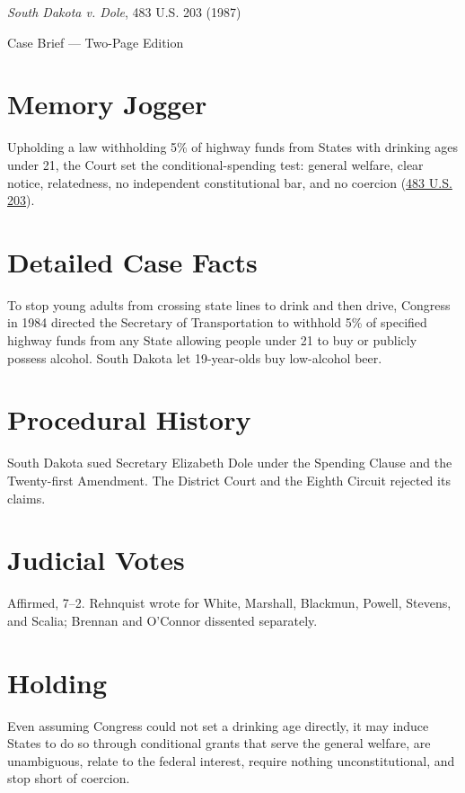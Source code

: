 \documentclass[12pt]{article}
\begin{document}
\begin{center}
{\LARGE \textit{South Dakota v. Dole}, 483 U.S. 203 (1987)\par}
\vspace{0.5em}
{\large Case Brief --- Two-Page Edition\par}
\end{center}

\section{Memory Jogger}
Upholding a law withholding 5\% of highway funds from States with drinking ages under 21, the Court set the conditional-spending test: general welfare, clear notice, relatedness, no independent constitutional bar, and no coercion (\href{https://supreme.justia.com/cases/federal/us/483/203/}{483 U.S. 203}).

\section{Detailed Case Facts}
To stop young adults from crossing state lines to drink and then drive, Congress in 1984 directed the Secretary of Transportation to withhold 5\% of specified highway funds from any State allowing people under 21 to buy or publicly possess alcohol. South Dakota let 19-year-olds buy low-alcohol beer.

\section{Procedural History}
South Dakota sued Secretary Elizabeth Dole under the Spending Clause and the Twenty-first Amendment. The District Court and the Eighth Circuit rejected its claims.

\section{Judicial Votes}
Affirmed, 7--2. Rehnquist wrote for White, Marshall, Blackmun, Powell, Stevens, and Scalia; Brennan and O'Connor dissented separately.

\section{Holding}
Even assuming Congress could not set a drinking age directly, it may induce States to do so through conditional grants that serve the general welfare, are unambiguous, relate to the federal interest, require nothing unconstitutional, and stop short of coercion.
\end{document}
